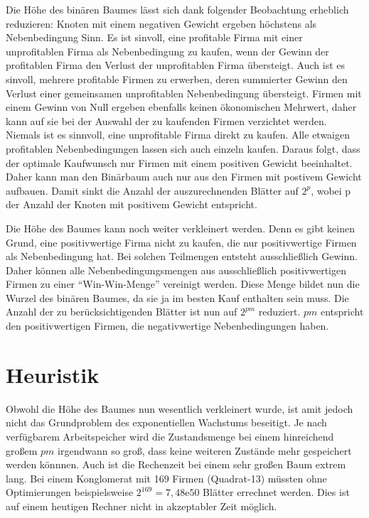Die Höhe des binären Baumes lässt sich dank folgender Beobachtung erheblich reduzieren:
Knoten mit einem negativen Gewicht ergeben höchstens als Nebenbedingung Sinn. Es ist sinvoll, eine profitable Firma mit einer unprofitablen Firma als Nebenbedingung zu kaufen, wenn der Gewinn der profitablen Firma den Verlust der unprofitablen Firma übersteigt. Auch ist es sinvoll, mehrere profitable Firmen zu erwerben, deren summierter Gewinn den Verlust einer gemeinsamen unprofitablen Nebenbedingung übersteigt. Firmen mit einem Gewinn von Null ergeben ebenfalls keinen ökonomischen Mehrwert, daher kann auf sie bei der Auswahl der zu kaufenden Firmen verzichtet werden.
Niemals ist es sinnvoll, eine unprofitable Firma direkt zu kaufen. Alle etwaigen profitablen Nebenbedingungen lassen sich auch einzeln kaufen. Daraus folgt, dass der optimale Kaufwunsch nur Firmen mit einem positiven Gewicht beeinhaltet. Daher kann man den Binärbaum auch nur aus den Firmen mit postivem Gewicht aufbauen. Damit sinkt die Anzahl der auszurechnenden Blätter auf \(2^p\), wobei p der Anzahl der Knoten mit positivem Gewicht entspricht.

Die Höhe des Baumes kann noch weiter verkleinert werden. Denn es gibt keinen Grund, eine positivwertige Firma nicht zu kaufen, die nur positivwertige Firmen als Nebenbedingung hat. Bei solchen Teilmengen entsteht ausschließlich Gewinn. Daher können alle Nebenbedingungsmengen aus ausschließlich positivwertigen Firmen zu einer "`Win-Win-Menge"' vereinigt werden. Diese Menge bildet nun die Wurzel des binären Baumes, da sie ja im besten Kauf enthalten sein muss. Die Anzahl der zu berücksichtigenden Blätter ist nun auf \(2^{pm}\) reduziert. \(pm\) entspricht den positivwertigen Firmen, die negativwertige Nebenbedingungen haben.

\section{Heuristik}
Obwohl die Höhe des Baumes nun wesentlich verkleinert wurde, ist amit jedoch nicht das Grundproblem des exponentiellen Wachstums beseitigt. Je nach verfügbarem Arbeitspeicher wird die Zustandsmenge bei einem hinreichend großem \(pm\) irgendwann so groß, dass keine weiteren Zustände mehr gespeichert werden könnnen. Auch ist die Rechenzeit bei einem sehr großen Baum extrem lang. Bei einem Konglomerat mit 169 Firmen (Quadrat-13) müssten ohne Optimierungen beispielsweise \(2^{169}=7,48\mathrm{e}{50}\) Blätter errechnet werden. Dies ist auf einem heutigen Rechner nicht in akzeptabler Zeit möglich.

